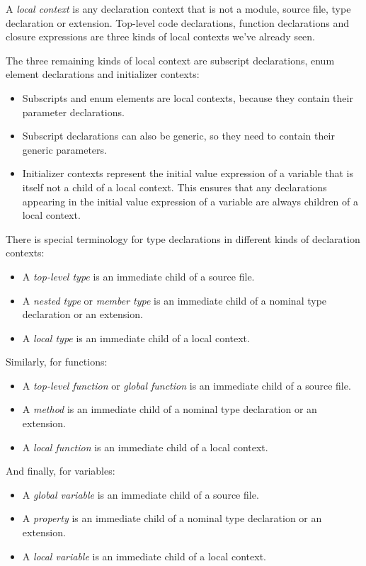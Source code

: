\documentclass[a4paper,headsepline,bibliography=totoc,toc=flat,fleqn,twoside=semi]{scrbook}
\theoremstyle{definition}
\theoremstyle{definition}
\theoremstyle{definition}
\begin{document}
A \emph{local context} is any declaration context that is not a module, source file, type declaration or extension. Top-level code declarations, function declarations and closure expressions are three kinds of local contexts we've already seen.

The three remaining kinds of local context are subscript declarations, enum element declarations and initializer contexts:
\begin{itemize}
\item Subscripts and enum elements are local contexts, because they contain their parameter declarations.
\item Subscript declarations can also be generic, so they need to contain their generic parameters.
\item Initializer contexts represent the initial value expression of a variable that is itself not a child of a local context. This ensures that any declarations appearing in the initial value expression of a variable are always children of a local context.
\end{itemize}

There is special terminology for type declarations in different kinds of declaration contexts:
\begin{itemize}
\item A \emph{top-level type} is an immediate child of a source file.
\item A \emph{nested type} or \emph{member type} is an immediate child of a nominal type declaration or an extension.
\item A \emph{local type} is an immediate child of a local context.
\end{itemize}
Similarly, for functions:
\begin{itemize}
\item A \emph{top-level function} or \emph{global function} is an immediate child of a source file.
\item A \emph{method} is an immediate child of a nominal type declaration or an extension.
\item A \emph{local function} is an immediate child of a local context.
\end{itemize}
And finally, for variables:
\begin{itemize}
\item A \emph{global variable} is an immediate child of a source file.
\item A \emph{property} is an immediate child of a nominal type declaration or an extension.
\item A \emph{local variable} is an immediate child of a local context.
\end{itemize}
\end{document}
